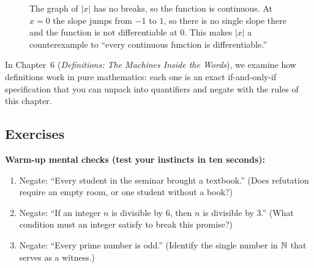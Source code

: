\begin{figure}[htbp]
\centering
{}
\caption{The graph of $|x|$ has no breaks, so the function is continuous. At $x = 0$ the slope jumps from $-1$ to $1$, so there is no single slope there and the function is not differentiable at $0$. This makes $|x|$ a counterexample to ``every continuous function is differentiable.''}
\label{05:fig-abs-corner}
\end{figure}

In Chapter~6 (\emph{Definitions: The Machines Inside the Words}), we examine how definitions work in pure mathematics: each one is an exact if-and-only-if specification that you can unpack into quantifiers and negate with the rules of this chapter.

\subsection{Exercises}

\textbf{Warm-up mental checks (test your instincts in ten seconds):}
\begin{enumerate}
\item Negate: ``Every student in the seminar brought a textbook.'' (Does refutation require an empty room, or one student without a book?)
\item Negate: ``If an integer $n$ is divisible by $6$, then $n$ is divisible by $3$.'' (What condition must an integer satisfy to break this promise?)
\item Negate: ``Every prime number is odd.'' (Identify the single number in $\mathbb{N}$ that serves as a witness.)
\end{enumerate}

